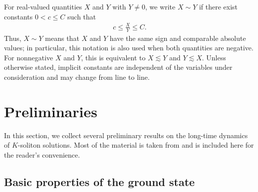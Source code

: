 \documentclass[reqno]{amsart}
\theoremstyle{plain}
\theoremstyle{definition}
\numberwithin{equation}{section}
\begin{document}
For real-valued quantities $X$ and $Y$ with $Y\neq0$, we write $X\sim Y$ if there exist constants $0<c\leq C$ such that
\begin{align}\label{signedcomparison}
c\leq\frac{X}{Y}\leq C.
\end{align}
Thus, $X\sim Y$ means that $X$ and $Y$ have the same sign and comparable absolute values; in particular, this notation is also used when both quantities are negative. For nonnegative $X$ and $Y$, this
is equivalent to $X\lesssim Y$ and $Y\lesssim X$. Unless otherwise stated, implicit constants are independent of the variables under consideration and may change from line to line.











\section{Preliminaries}
In this section, we collect several preliminary results on the long-time dynamics of $K$-soliton solutions. Most of the material is taken from \cite[Section 2 and Section 3]{I2} and is included here for the reader's
convenience.

\subsection{Basic properties of the ground state}
\end{document}
